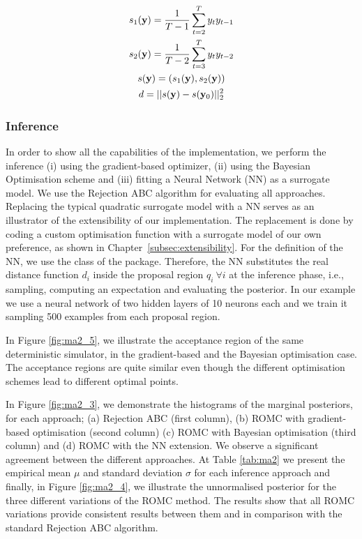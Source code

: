 \begin{gather}
  \label{eq:ma2_summary_1} s_1(\mathbf{y}) = \frac{1}{T-1} \sum_{t=2}^T y_ty_{t-1}\\
  \label{eq:ma2_summary_2} s_2(\mathbf{y}) = \frac{1}{T-2} \sum_{t=3}^T y_ty_{t-2} \\
  s(\mathbf{y}) = (s_1(\mathbf{y}), s_2(\mathbf{y}))\\
  \label{eq:ma2_summary_4} d = ||s(\mathbf{y}) - s(\mathbf{y}_0)||_2^2
\end{gather}

\subsubsection*{Inference}

In order to show all the capabilities of the implementation, we
perform the inference (i) using the gradient-based optimizer, (ii)
using the Bayesian Optimisation scheme and (iii) fitting a Neural
Network (NN) as a surrogate model. We use the Rejection ABC algorithm
for evaluating all approaches. Replacing the typical quadratic
surrogate model with a NN serves as an illustrator of the
extensibility of our implementation. The replacement is done by coding
a custom optimisation function with a surrogate model of our own
preference, as shown in Chapter~\ref{subsec:extensibility}. For the
definition of the NN, we use the  class of the
 package. Therefore, the NN substitutes the real
distance function \(d_i\) inside the proposal region
\(q_i~ \forall i\) at the inference phase, i.e., sampling,
computing an expectation and evaluating the posterior. In our example
we use a neural network of two hidden layers of 10 neurons each and we
train it sampling 500 examples from each proposal region.

In Figure \ref{fig:ma2_5}, we illustrate the acceptance region of the
same deterministic simulator, in the gradient-based and the Bayesian
optimisation case. The acceptance regions are quite similar even though the
different optimisation schemes lead to different optimal points.

In Figure \ref{fig:ma2_3}, we demonstrate the histograms of the
marginal posteriors, for each approach; (a) Rejection ABC (first
column), (b) ROMC with gradient-based optimisation (second column) (c)
ROMC with Bayesian optimisation (third column) and (d) ROMC with the
NN extension. We observe a significant agreement between the
different approaches. At Table \ref{tab:ma2} we present the empirical
mean \(\mu\) and standard deviation \(\sigma\) for each inference
approach and finally, in Figure \ref{fig:ma2_4}, we illustrate the
unnormalised posterior for the three different variations of the ROMC
method. The results show that all ROMC variations provide consistent
results between them and in comparison with the standard Rejection ABC
algorithm.

